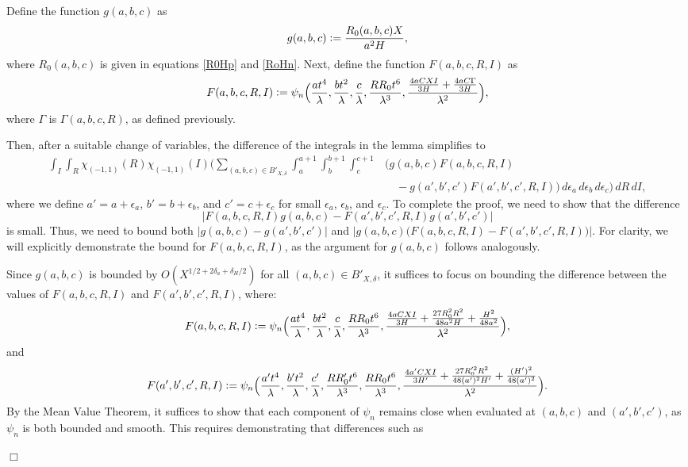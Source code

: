 \documentclass[10pt,a4paper]{amsart}
\newenvironment{proof}{\noindent {\bf Proof:}}{$\Box$ \vspace{2 ex}}
\begin{document}
\begin{proof}  Define the function $g(a, b, c)$ as  
\begin{equation*}
    g(a, b, c) \vcentcolon= \frac{R_0(a, b, c) X}{a^2 H},
\end{equation*}  
where $R_0(a,b,c)$ is given in equations \eqref{R0Hp} and \eqref{RoHn}.  
Next, define the function $F(a, b, c, R, I)$ as
\begin{equation*}
    F(a, b, c, R, I) \vcentcolon= \psi_{n} \Big( \frac{at^4}{\lambda}, \frac{bt^2}{\lambda}, \frac{c}{\lambda}, \frac{RR_0 t^6}{\lambda^3}, \frac{\frac{4aCXI}{3H} + \frac{4aC\Gamma}{3H}}{\lambda^2} \Big),
\end{equation*}
where $\Gamma$ is $\Gamma(a,b,c,R)$, as defined previously.

Then, after a suitable change of variables, the difference of the integrals in the lemma simplifies to
\begin{align*} 
\int_{I} \int_{R}  \chi_{(-1,1)}(R) \chi_{(-1,1)}(I) \Big( \sum_{(a,b,c)\in B'_{X,\delta}} \int_{a}^{a+1} \int_{b}^{b+1} \int_{c}^{c+1} & \Big( g(a,b,c) F(a, b, c, R, I) \\
&\quad - g(a',b',c') F(a', b', c', R, I) \Big) \, d\epsilon_a \, d\epsilon_b \, d\epsilon_c \Big)\, dR \, dI,
\end{align*}
where we define $a' = a + \epsilon_a$, $b' = b + \epsilon_b$, and $c' = c + \epsilon_c$ for small $\epsilon_a$, $\epsilon_b$, and $\epsilon_c$.
\noindent To complete the proof, we need to show that the difference 
\[
\left| F(a, b, c, R, I) g(a, b, c) - F(a', b', c', R, I) g(a', b', c') \right|
\]
is small. Thus, we need to bound both $|g(a, b, c) - g(a', b', c')|$ and $|g(a,b,c)\big(F(a, b, c, R, I) - F(a', b', c', R, I)\big)|$. For clarity, we will explicitly demonstrate the bound for $F(a, b, c, R, I)$, as the argument for $g(a, b, c)$ follows analogously.

Since $g(a, b, c)$ is bounded by $O(X^{1/2 + 2 \delta_a + \delta_H/2})$ for all $(a, b, c) \in B'_{X, \delta}$, it suffices to focus on bounding the difference between the values of $F(a, b, c, R, I)$ and $F(a', b', c', R, I)$, where:
\begin{equation*}
F(a, b, c, R, I) \vcentcolon= \psi_{n} \Big( \frac{a t^4}{\lambda}, \frac{b t^2}{\lambda}, \frac{c}{\lambda}, \frac{R R_0 t^6}{\lambda^3}, \frac{\frac{4aCXI}{3H} +  \frac{27 R_0^2R^2}{48 a^2 H} + \frac{H^2}{48 a^2}}{\lambda^2}\Big),
\end{equation*}
and
\begin{equation*}
F(a', b', c', R, I) \vcentcolon= \psi_{n} \Big( \frac{a' t^4}{\lambda}, \frac{b' t^2}{\lambda}, \frac{c'}{\lambda}, \frac{R R_0' t^6}{\lambda^3}, \frac{R R_0 t^6}{\lambda^3}, \frac{\frac{4a'CXI}{3H'} +  \frac{27 R_0'^2R^2}{48 (a')^2 H'} + \frac{(H')^2}{48 (a')^2}}{\lambda^2} \Big).
\end{equation*}
By the Mean Value Theorem, it suffices to show that each component of $\psi_{n}$ remains close when evaluated at $(a, b, c)$ and $(a', b', c')$, as $\psi_{n}$ is both bounded and smooth. This requires demonstrating that differences such as


\end{proof}
\end{document}
